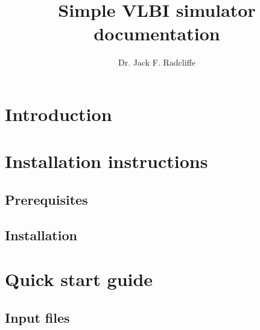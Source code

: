 \documentclass[11pt]{report_jfr}
\title{\fontfamily{lmss}\selectfont Simple VLBI simulator documentation\vspace{-1em}}
\date{\vspace{-3.5em}}
\author{\fontfamily{lmss}\selectfont Dr. Jack F. Radcliffe\vspace{-2em}}
\begin{document}
\maketitle
\thispagestyle{coverstyle}
\selectfont
\section{Introduction}

\section{Installation instructions}
\subsection{Prerequisites}
\subsection{Installation}

\section{Quick start guide}
\subsection{Input files}
\end{document}
